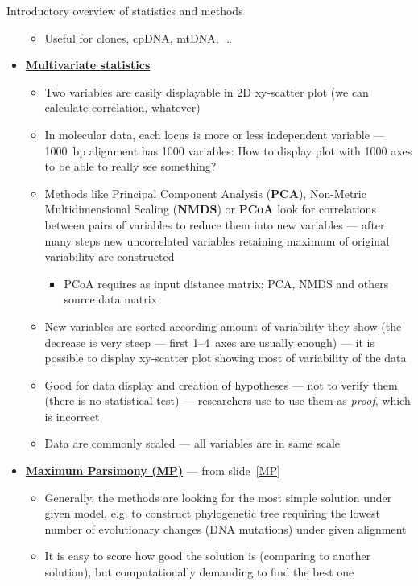 \documentclass[compress, xelatex, 11pt, xcolor=svgnames, aspectratio=169,
	hyperref={
		bookmarks=true,
		unicode=true,
		colorlinks=true,
		pdftitle={Molecular data in R},
		plainpages=false,
		pdfauthor={Vojtech Zeisek},
		pdfsubject={Course about phylogeny and evolution in R},
		pdfcreator={XeLaTeX},
		pdfkeywords={R, evolution, phylogeny, molecular data},
		linkcolor=Crimson, %
		anchorcolor=Magenta, %
		citecolor=Magenta, %
		filecolor=Magenta, %
		menucolor=Magenta, %
		urlcolor=DodgerBlue, %
		},
	url={hyphens, lowtilde} %
	]{beamer}
\begin{document}
\begin{frame}[allowframebreaks]{Introductory overview of statistics and methods}
\begin{itemize}
\begin{itemize}
			\item Useful for clones, cpDNA, mtDNA,~\ldots
			\end{itemize}
		\item \textbf{\href{https://en.wikipedia.org/wiki/Multivariate_statistics}{Multivariate statistics}}
		\begin{itemize}
			\item Two variables are easily displayable in 2D xy-scatter plot (we can calculate correlation, whatever)
			\item In molecular data, each locus is more or less independent variable --- 1000~bp alignment has 1000 variables: How to display plot with 1000 axes to be able to really see something?
			\item Methods like Principal Component Analysis (\textbf{PCA}), Non-Metric Multidimensional Scaling (\textbf{NMDS}) or \textbf{PCoA} look for correlations between pairs of variables to reduce them into new variables --- after many steps new uncorrelated variables retaining maximum of original variability are constructed
			\begin{itemize}
				\item PCoA requires as input distance matrix; PCA, NMDS and others source data matrix
			\end{itemize}
			\item New variables are sorted according amount of variability they show (the decrease is very steep --- first 1--4~axes are usually enough) --- it is possible to display xy-scatter plot showing most of variability of the data
			\item Good for data display and creation of hypotheses --- not to verify them (there is no statistical test) --- researchers use to use them as \textit{proof}, which is incorrect
			\item Data are commonly scaled --- all variables are in same scale
		\end{itemize}
		\item \textbf{\href{https://en.wikipedia.org/wiki/Maximum_parsimony_(phylogenetics)}{Maximum Parsimony (MP)}} --- from slide~\ref{MP}
		\begin{itemize}
			\item Generally, the methods are looking for the most simple solution under given model, e.g. to construct phylogenetic tree requiring the lowest number of evolutionary changes (DNA mutations) under given alignment
			\item It is easy to score how good the solution is (comparing to another solution), but computationally demanding to find the best one

\end{itemize}
\end{itemize}
\end{frame}
\end{document}
